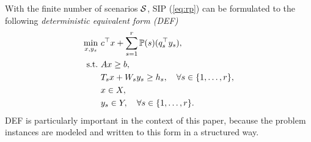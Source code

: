 With the finite number of scenarios $\mathcal{S}$, SIP (\ref{eq:rp}) can be formulated to the following \textit{deterministic equivalent form (DEF)} 
\begin{subequations}\label{sip:ef}
\begin{align}
\min_{x,y_s}\ &c^{\top}x + \sum_{s=1}^{r}\operatorname*{\mathbb{P}}(s) (q_s^{\top}y_s), \label{ef:obj}\\ 
\mathrm{s.t.}\ &Ax\ge b,  \label{ef:b}\\
	&T_s x+W_s y_s\ge h_s,\quad\forall s\in\{1,\ldots,r\}, \label{ef:c} \\
	&x\in X, \label{ef:d} \\
	&y_s \in Y,\quad\forall s\in\{1,\ldots,r\}. \label{ef:e}
\end{align}
\end{subequations}
DEF is particularly important in the context of this paper, because the problem instances are modeled and written to this form in a structured way. 

